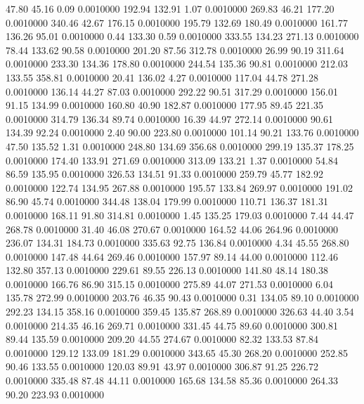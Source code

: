   47.80   45.16    0.09   0.0010000
 192.94  132.91    1.07   0.0010000
 269.83   46.21  177.20   0.0010000
 340.46   42.67  176.15   0.0010000
 195.79  132.69  180.49   0.0010000
 161.77  136.26   95.01   0.0010000
   0.44  133.30    0.59   0.0010000
 333.55  134.23  271.13   0.0010000
  78.44  133.62   90.58   0.0010000
 201.20   87.56  312.78   0.0010000
  26.99   90.19  311.64   0.0010000
 233.30  134.36  178.80   0.0010000
 244.54  135.36   90.81   0.0010000
 212.03  133.55  358.81   0.0010000
  20.41  136.02    4.27   0.0010000
 117.04   44.78  271.28   0.0010000
 136.14   44.27   87.03   0.0010000
 292.22   90.51  317.29   0.0010000
 156.01   91.15  134.99   0.0010000
 160.80   40.90  182.87   0.0010000
 177.95   89.45  221.35   0.0010000
 314.79  136.34   89.74   0.0010000
  16.39   44.97  272.14   0.0010000
  90.61  134.39   92.24   0.0010000
   2.40   90.00  223.80   0.0010000
 101.14   90.21  133.76   0.0010000
  47.50  135.52    1.31   0.0010000
 248.80  134.69  356.68   0.0010000
 299.19  135.37  178.25   0.0010000
 174.40  133.91  271.69   0.0010000
 313.09  133.21    1.37   0.0010000
  54.84   86.59  135.95   0.0010000
 326.53  134.51   91.33   0.0010000
 259.79   45.77  182.92   0.0010000
 122.74  134.95  267.88   0.0010000
 195.57  133.84  269.97   0.0010000
 191.02   86.90   45.74   0.0010000
 344.48  138.04  179.99   0.0010000
 110.71  136.37  181.31   0.0010000
 168.11   91.80  314.81   0.0010000
   1.45  135.25  179.03   0.0010000
   7.44   44.47  268.78   0.0010000
  31.40   46.08  270.67   0.0010000
 164.52   44.06  264.96   0.0010000
 236.07  134.31  184.73   0.0010000
 335.63   92.75  136.84   0.0010000
   4.34   45.55  268.80   0.0010000
 147.48   44.64  269.46   0.0010000
 157.97   89.14   44.00   0.0010000
 112.46  132.80  357.13   0.0010000
 229.61   89.55  226.13   0.0010000
 141.80   48.14  180.38   0.0010000
 166.76   86.90  315.15   0.0010000
 275.89   44.07  271.53   0.0010000
   6.04  135.78  272.99   0.0010000
 203.76   46.35   90.43   0.0010000
   0.31  134.05   89.10   0.0010000
 292.23  134.15  358.16   0.0010000
 359.45  135.87  268.89   0.0010000
 326.63   44.40    3.54   0.0010000
 214.35   46.16  269.71   0.0010000
 331.45   44.75   89.60   0.0010000
 300.81   89.44  135.59   0.0010000
 209.20   44.55  274.67   0.0010000
  82.32  133.53   87.84   0.0010000
 129.12  133.09  181.29   0.0010000
 343.65   45.30  268.20   0.0010000
 252.85   90.46  133.55   0.0010000
 120.03   89.91   43.97   0.0010000
 306.87   91.25  226.72   0.0010000
 335.48   87.48   44.11   0.0010000
 165.68  134.58   85.36   0.0010000
 264.33   90.20  223.93   0.0010000
